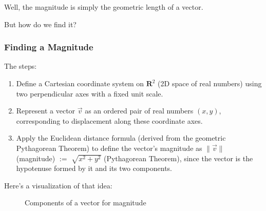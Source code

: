 \documentclass[12pt]{article}
\begin{document}
Well, the magnitude is simply the geometric length of a vector.

But how do we find it?

\subsubsection{Finding a Magnitude}
The steps:
\begin{enumerate}
    \item Define a Cartesian coordinate system on $\mathbf{R}^2$ (2D space of real numbers) using two perpendicular axes with a fixed unit scale.
    \item Represent a vector $\vec{v}$ as an ordered pair of real numbers $(x, y)$, corresponding to displacement along these coordinate axes.
    \item Apply the Euclidean distance formula (derived from the geometric Pythagorean Theorem) to define the vector's magnitude as $\|\vec{v}\|$ (magnitude) $:=$ $\sqrt{x^2 + y^2}$ (Pythagorean Theorem), since the vector is the hypotenuse formed by it and its two components.
\end{enumerate}

Here's a visualization of that idea:

\begin{figure}[H]
    \centering
    \caption{Components of a vector for magnitude}
\end{figure}
\end{document}
